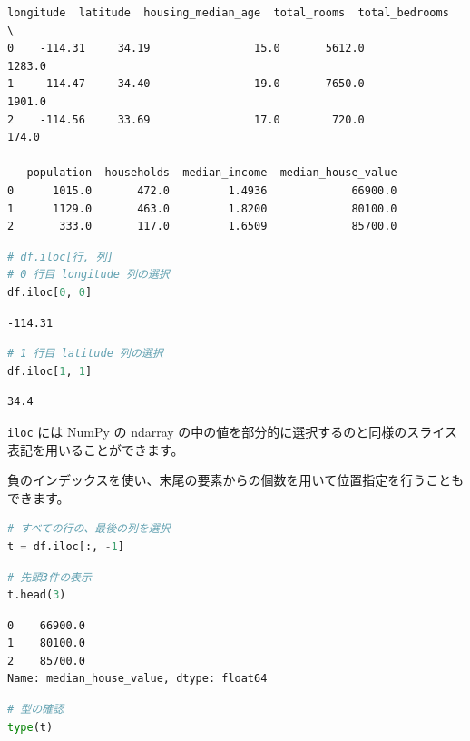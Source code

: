 \begin{lstlisting}[style=outputcell]
   longitude  latitude  housing_median_age  total_rooms  total_bedrooms  \
0    -114.31     34.19                15.0       5612.0          1283.0   
1    -114.47     34.40                19.0       7650.0          1901.0   
2    -114.56     33.69                17.0        720.0           174.0   

   population  households  median_income  median_house_value  
0      1015.0       472.0         1.4936             66900.0  
1      1129.0       463.0         1.8200             80100.0  
2       333.0       117.0         1.6509             85700.0  
\end{lstlisting}

\begin{lstlisting}[style=codecell,language=Python]
# df.iloc[行, 列]
# 0 行目 longitude 列の選択
df.iloc[0, 0]
\end{lstlisting}

\begin{lstlisting}[style=outputcell]
-114.31
\end{lstlisting}

\begin{lstlisting}[style=codecell,language=Python]
# 1 行目 latitude 列の選択
df.iloc[1, 1]
\end{lstlisting}

\begin{lstlisting}[style=outputcell]
34.4
\end{lstlisting}

\texttt{iloc} には NumPy の ndarray の中の値を部分的に選択するのと同様のスライス表記を用いることができます。

負のインデックスを使い、末尾の要素からの個数を用いて位置指定を行うこともできます。


\begin{lstlisting}[style=codecell,language=Python]
# すべての行の、最後の列を選択
t = df.iloc[:, -1]
\end{lstlisting}

\begin{lstlisting}[style=codecell,language=Python]
# 先頭3件の表示
t.head(3)
\end{lstlisting}

\begin{lstlisting}[style=outputcell]
0    66900.0
1    80100.0
2    85700.0
Name: median_house_value, dtype: float64
\end{lstlisting}

\begin{lstlisting}[style=codecell,language=Python]
# 型の確認
type(t)
\end{lstlisting}

